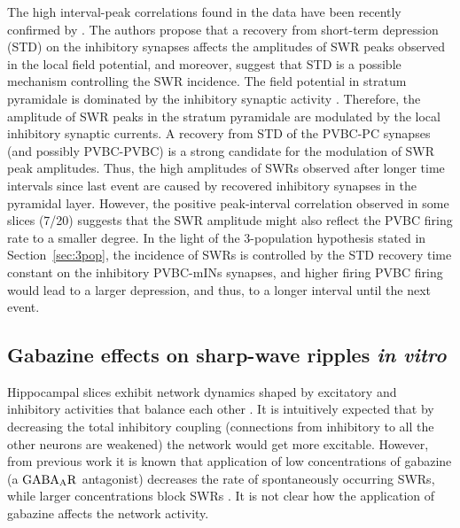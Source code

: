     The high interval-peak correlations found in the data have been recently
    confirmed by \cite{Kohus2016}. The authors propose that a recovery from
    short-term depression (STD) on the inhibitory synapses affects the
    amplitudes of SWR peaks observed in the local field potential, and
    moreover, suggest that STD is a possible mechanism controlling the SWR
    incidence. The field potential in stratum pyramidale is dominated by the
    inhibitory synaptic activity \citep{Schonberger2014}. Therefore, the
    amplitude of SWR peaks in the stratum pyramidale are modulated by the local
    inhibitory synaptic currents. A recovery from STD of the PVBC-PC synapses
    (and possibly PVBC-PVBC) is a strong candidate for the modulation of SWR
    peak amplitudes. Thus, the high amplitudes of SWRs observed after longer
    time intervals since last event are caused by recovered inhibitory synapses
    in the pyramidal layer. However, the positive peak-interval correlation
    observed in some slices (7/20) suggests that the SWR amplitude might also
    reflect the PVBC firing rate to a smaller degree. In the light of the
    3-population hypothesis stated in Section~\ref{sec:3pop}, the incidence of
    SWRs is controlled by the STD recovery time constant on the inhibitory
    PVBC-mINs synapses, and higher firing PVBC firing would lead to a larger
    depression, and thus, to a longer interval until the next event.



    
  \subsection{Gabazine effects on sharp-wave ripples {\textit {in vitro}} }
    \label{sec:gabazine_invitro}
    Hippocampal slices exhibit network dynamics shaped by excitatory and
    inhibitory activities that balance each other \citep{Csicsvari1999,
    Maier2011, English2014, Hulse2016}. It is intuitively expected that by
    decreasing the total inhibitory coupling (connections from inhibitory to
    all the other neurons are weakened) the network would get more excitable.
    However, from previous work \citep[e.g.,][]{Nimmrich2005} it is known that
    application of low concentrations of gabazine (a $\rm GABA_AR$ antagonist)
    decreases the rate of spontaneously occurring SWRs, while larger
    concentrations block SWRs \citep{Maier2003, Ellender2010}. It is not clear
    how the application of gabazine affects the network activity. 
    
